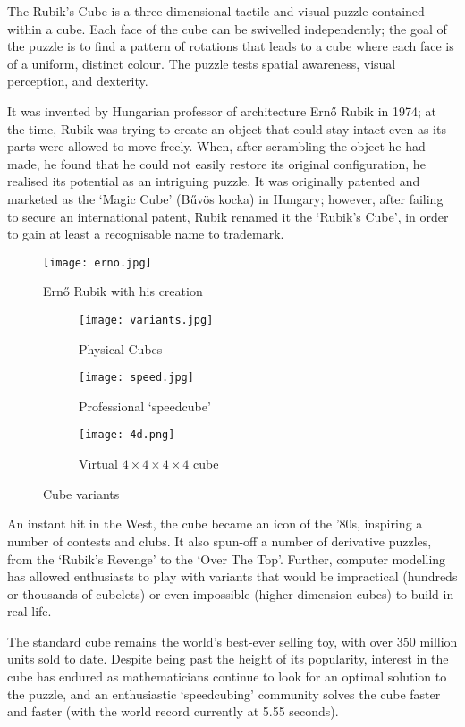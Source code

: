 
The Rubik's Cube is a three-dimensional tactile and visual puzzle contained within a  cube. Each face of the cube can be swivelled independently; the goal of the puzzle is to find a pattern of rotations that leads to a cube where each face is of a uniform, distinct colour. The puzzle tests spatial awareness, visual perception, and dexterity. 
	
	It was invented by Hungarian professor of architecture Ern\H{o} Rubik in 1974; at the time, Rubik was trying to create an object that could stay intact even as its parts were allowed to move freely. When, after scrambling the object he had made, he found that he could not easily restore its original configuration, he realised its potential as an intriguing puzzle. It was originally patented and marketed as the `Magic Cube' (B\H{u}v\"{o}s kocka) in Hungary; however, after failing to secure an international patent, Rubik renamed it the `Rubik's Cube', in order to gain at least a recognisable name to trademark.
\begin{figure}[h]
	\centering
	\texttt{[image: erno.jpg]}
	\caption{Ern\H{o} Rubik with his creation}
\end{figure}
\begin{figure}[h]
	\centering
	\begin{subfigure}[b]{0.3\textwidth}
		\texttt{[image: variants.jpg]}
		\caption{Physical Cubes}
	\end{subfigure}\begin{subfigure}[b]{0.3\textwidth}
		\texttt{[image: speed.jpg]}	
		\caption{Professional `speedcube'}
	\end{subfigure}\begin{subfigure}[b]{0.3\textwidth}
		\texttt{[image: 4d.png]}
		\caption{Virtual $4{\times}4{\times}4{\times}4$  cube}	\end{subfigure}
	\caption{Cube variants}
\end{figure}	\newpage
	 An instant hit in the West, the cube became an icon of the '80s, inspiring a number of contests and clubs. It also spun-off a number of derivative puzzles, from the  `Rubik's Revenge' to the  `Over The Top'. Further, computer modelling has allowed enthusiasts to play with variants that would be impractical (hundreds or thousands of cubelets) or even impossible (higher-dimension cubes) to build in real life.

	The standard cube remains the world's best-ever selling toy, with over 350 million units sold to date. Despite being past the height of its popularity, interest in the cube has endured as mathematicians continue to look for an optimal solution to the puzzle, and an enthusiastic `speedcubing' community solves the cube faster and faster (with the world record currently at 5.55 seconds).
	
